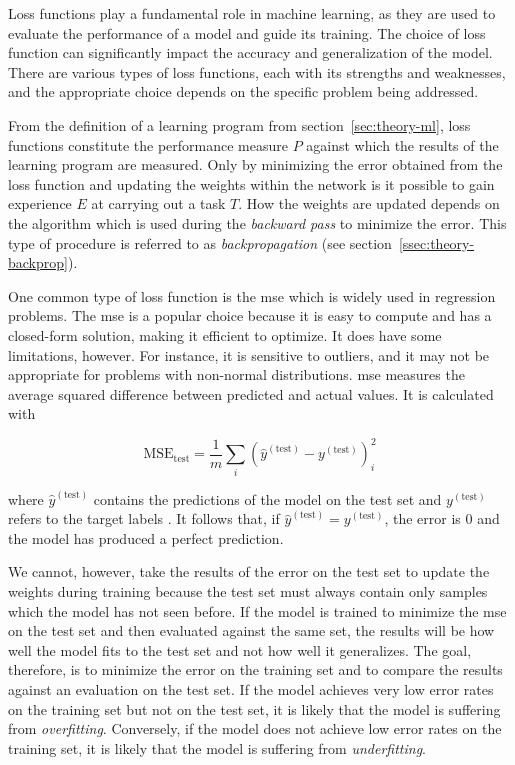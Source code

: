 \documentclass[draft,final]{vutinfth} %
\begin{document}
Loss functions play a fundamental role in machine learning, as they
are used to evaluate the performance of a model and guide its
training. The choice of loss function can significantly impact the
accuracy and generalization of the model. There are various types of
loss functions, each with its strengths and weaknesses, and the
appropriate choice depends on the specific problem being addressed.

From the definition of a learning program from
section~\ref{sec:theory-ml}, loss functions constitute the performance
measure $P$ against which the results of the learning program are
measured. Only by minimizing the error obtained from the loss function
and updating the weights within the network is it possible to gain
experience $E$ at carrying out a task $T$. How the weights are updated
depends on the algorithm which is used during the \emph{backward pass}
to minimize the error. This type of procedure is referred to as
\emph{backpropagation} (see section~\ref{ssec:theory-backprop}).

One common type of loss function is the \gls{mse} which is widely used
in regression problems. The \gls{mse} is a popular choice because it
is easy to compute and has a closed-form solution, making it efficient
to optimize. It does have some limitations, however. For instance, it
is sensitive to outliers, and it may not be appropriate for problems
with non-normal distributions. \gls{mse} measures the average squared
difference between predicted and actual values. It is calculated with

\begin{equation}
  \label{eq:mse}
  \mathrm{MSE_{test}} = \frac{1}{m}\sum_i(\hat{y}^{(\mathrm{test})} - y^{(\mathrm{test})})_i^2
\end{equation}

where $\hat{y}^{(\mathrm{test})}$ contains the predictions of the
model on the test set and $y^{(\mathrm{test})}$ refers to the target
labels \cite{goodfellow2016}. It follows that, if
$\hat{y}^{(\mathrm{test})} = y^{(\mathrm{test})}$, the error is $0$
and the model has produced a perfect prediction.

We cannot, however, take the results of the error on the test set to
update the weights during training because the test set must always
contain only samples which the model has not seen before. If the model
is trained to minimize the \gls{mse} on the test set and then
evaluated against the same set, the results will be how well the model
fits to the test set and not how well it generalizes. The goal,
therefore, is to minimize the error on the training set and to compare
the results against an evaluation on the test set. If the model
achieves very low error rates on the training set but not on the test
set, it is likely that the model is suffering from
\emph{overfitting}. Conversely, if the model does not achieve low
error rates on the training set, it is likely that the model is
suffering from \emph{underfitting}.
\end{document}

